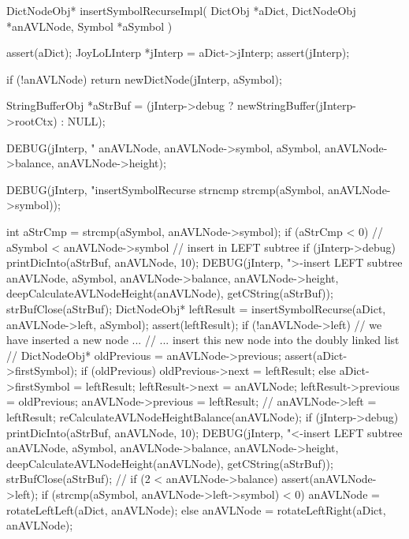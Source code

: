 \startCCode
DictNodeObj* insertSymbolRecurseImpl(
  DictObj     *aDict,
  DictNodeObj *anAVLNode,
  Symbol      *aSymbol
) {
  assert(aDict);
  JoyLoLInterp *jInterp = aDict->jInterp;
  assert(jInterp);
  
  if (!anAVLNode) return newDictNode(jInterp, aSymbol);

  StringBufferObj *aStrBuf = 
    (jInterp->debug ? newStringBuffer(jInterp->rootCtx) : NULL);

  DEBUG(jInterp, "\ninsertSymbolRecurse %
        anAVLNode, anAVLNode->symbol, aSymbol,
        anAVLNode->balance, anAVLNode->height);

  DEBUG(jInterp, "insertSymbolRecurse strncmp %
        strcmp(aSymbol, anAVLNode->symbol));

  int aStrCmp = strcmp(aSymbol, anAVLNode->symbol);
  if (aStrCmp < 0) {
    // aSymbol < anAVLNode->symbol // insert in LEFT subtree
    if (jInterp->debug) {
      printDicInto(aStrBuf, anAVLNode, 10);
      DEBUG(jInterp, ">-insert LEFT subtree %
            anAVLNode, aSymbol, anAVLNode->balance,
            anAVLNode->height, deepCalculateAVLNodeHeight(anAVLNode),
            getCString(aStrBuf));
      strBufClose(aStrBuf);
    }
    DictNodeObj* leftResult =
      insertSymbolRecurse(aDict, anAVLNode->left, aSymbol);
    assert(leftResult);
    if (!anAVLNode->left) {
      // we have inserted a new node ...
      // ... insert this new node into the doubly linked list
      //
      DictNodeObj* oldPrevious           = anAVLNode->previous;
      assert(aDict->firstSymbol);
      if (oldPrevious) oldPrevious->next = leftResult;
      else aDict->firstSymbol            = leftResult;
      leftResult->next                   = anAVLNode;
      leftResult->previous               = oldPrevious;
      anAVLNode->previous                = leftResult;
      //
    }
    anAVLNode->left = leftResult;
    reCalculateAVLNodeHeightBalance(anAVLNode);
    if (jInterp->debug) {
      printDicInto(aStrBuf, anAVLNode, 10);
      DEBUG(jInterp, "<-insert LEFT subtree %
          anAVLNode, aSymbol, anAVLNode->balance,
          anAVLNode->height, deepCalculateAVLNodeHeight(anAVLNode),
          getCString(aStrBuf));
      strBufClose(aStrBuf);
    }
    //
    if (2 < anAVLNode->balance) {
      assert(anAVLNode->left);
      if (strcmp(aSymbol, anAVLNode->left->symbol) < 0) {
        anAVLNode = rotateLeftLeft(aDict, anAVLNode);
      } else {
        anAVLNode = rotateLeftRight(aDict, anAVLNode);
      }
    }
}}
